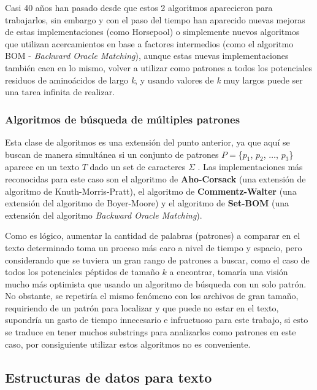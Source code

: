 Casi 40 años han pasado desde que estos 2 algoritmos aparecieron para trabajarlos, sin embargo y con el paso del tiempo han aparecido nuevas mejoras de estas implementaciones (como Horsepool) o simplemente nuevos algoritmos que utilizan acercamientos en base a factores intermedios (como el algoritmo BOM - \textit{Backward Oracle Matching}), aunque estas nuevas implementaciones también caen en lo mismo, volver a utilizar como patrones a todos los potenciales residuos de aminoácidos de largo \textit{k}, y usando valores de \textit{k} muy largos puede ser una tarea infinita de realizar.

\subsubsection{Algoritmos de búsqueda de múltiples patrones}

Esta clase de algoritmos es una extensión del punto anterior, ya que aquí se buscan de manera simultánea si un conjunto de patrones $P=$\{$p_{1}$, $p_{2}$, $\ldots$, $p_{3}$\} aparece en un texto $T$ dado un set de caracteres $\Sigma$ \cite{stringmatching}. Las implementaciones más reconocidas para este caso son el algoritmo de \textbf{Aho-Corsack} (una extensión de algoritmo de Knuth-Morris-Pratt), el algoritmo de \textbf{Commentz-Walter} (una extensión del algoritmo de Boyer-Moore) y el algoritmo de \textbf{Set-BOM} (una extensión del algoritmo \textit{Backward Oracle Matching}). 

Como es lógico, aumentar la cantidad de palabras (patrones) a comparar en el texto determinado toma un proceso más caro a nivel de tiempo y espacio, pero considerando que se tuviera un gran rango de patrones a buscar, como el caso de todos los potenciales péptidos de tamaño $k$ a encontrar, tomaría una visión mucho más optimista que usando un algoritmo de búsqueda con un solo patrón. No obstante, se repetiría el mismo fenómeno con los archivos de gran tamaño, requiriendo de un patrón para localizar y que puede no estar en el texto, supondría un gasto de tiempo innecesario e infructuoso para este trabajo, si esto se traduce en tener muchos substrings para analizarlos como patrones en este caso, por consiguiente utilizar estos algoritmos no es conveniente.



\subsection{Estructuras de datos para texto}

